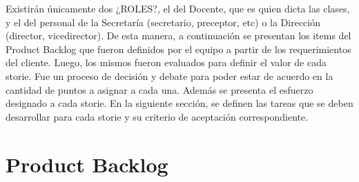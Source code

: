 \documentclass[a4paper, 11pt]{article}
\begin{document}
Existirán únicamente dos ¿ROLES?, el del Docente, que es quien dicta las clases, y el del personal de la Secretaría (secretario, preceptor, etc) o la Dirección (director, vicedirector). De esta manera, a continuación se presentan los items del Product Backlog que fueron definidos por el equipo a partir de los requerimientos del cliente. Luego, los mismos fueron evaluados para definir el valor de cada storie. Fue un proceso de decisión y debate para poder estar de acuerdo en la cantidad de puntos a asignar a cada una. Además se presenta el esfuerzo designado a cada storie. En la siguiente sección, se definen las tareas que se deben desarrollar para cada storie y su criterio de aceptación correspondiente. 

\newpage
\section{Product Backlog}
\end{document}
